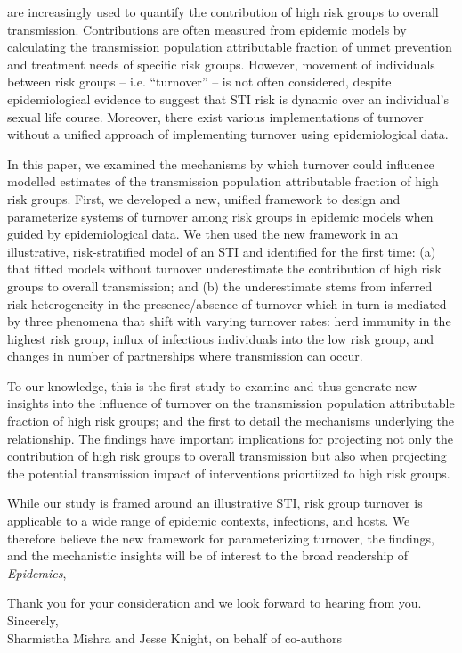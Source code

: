 \documentclass[a4]{article}
\begin{document}
are increasingly used to 
quantify the contribution of high risk groups to overall transmission.
Contributions are often measured from epidemic models 
by calculating the transmission population attributable 
fraction of unmet prevention and treatment needs of specific risk groups.
However, movement of individuals between risk groups
-- i.e. ``turnover'' --					%
is not often considered, despite epidemiological evidence to suggest 
that STI risk is dynamic over an individual's sexual life course.
Moreover, there exist various implementations of turnover without
a unified approach of implementing turnover using epidemiological data.		
\par
In this paper, we examined the mechanisms by which turnover could
influence modelled estimates of the transmission population 
attributable fraction of high risk groups. First, we developed
a new, unified framework to design and parameterize
systems of turnover among risk groups in epidemic models when
guided by epidemiological data. We then 
used the new framework in an illustrative, risk-stratified model of an STI
and identified for the first time: (a) that fitted models without turnover underestimate
the contribution of high risk groups to overall transmission; and (b) 
the underestimate stems from inferred 
risk heterogeneity in the presence/absence of turnover which in turn is mediated by
three phenomena that shift with varying turnover rates: herd immunity 
in the highest risk group, influx of infectious individuals into the low risk group,
and changes in number of partnerships where transmission can occur.

\par
To our knowledge, this is the first study to examine and thus generate new insights 
into the influence of turnover
on the transmission population attributable fraction of high risk groups; and the first
to detail the mechanisms underlying the relationship. The findings have important
implications for projecting not only the contribution of high risk groups to overall transmission 
but also when projecting the potential transmission impact of interventions priortiized to high risk groups.

\par
While our study is framed around an illustrative STI,
risk group turnover is applicable to a wide range of 
epidemic contexts, infections, and hosts. 
We therefore believe the new framework for parameterizing turnover, 
the findings, and the mechanistic insights will be of interest to the broad readership of
 \textit{Epidemics},


\par
Thank you for your consideration and we look forward to hearing from you.
\\[2em]
Sincerely,\\[1em]
Sharmistha Mishra and Jesse Knight, on behalf of co-authors
\end{document}
